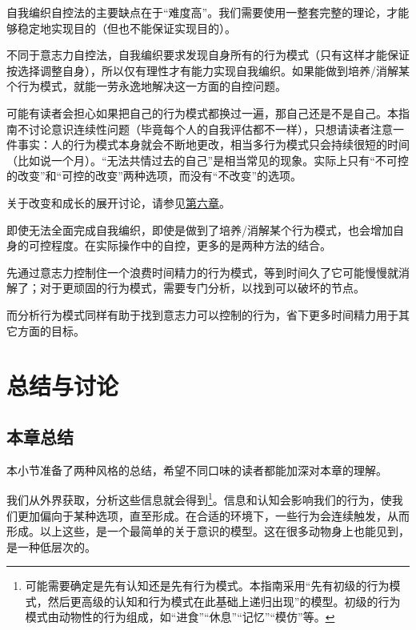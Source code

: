 自我编织自控法的主要缺点在于“难度高”。我们需要使用一整套完整的理论，才能够稳定地实现目的（但也不能保证实现目的）。
\begin{explain}
不同于意志力自控法，自我编织要求发现自身所有的行为模式（只有这样才能保证按选择调整自身），所以仅有理性才有能力实现自我编织。如果能做到培养/消解某个行为模式，就能一劳永逸地解决这一方面的自控问题。

可能有读者会担心如果把自己的行为模式都换过一遍，那自己还是不是自己。本指南不讨论意识连续性问题（毕竟每个人的自我评估都不一样），只想请读者注意一件事实：人的行为模式本身就会不断地更改，相当多行为模式只会持续很短的时间（比如说一个月）。“无法共情过去的自己”是相当常见的现象。实际上只有“不可控的改变”和“可控的改变”两种选项，而没有“不改变”的选项。

关于改变和成长的展开讨论，请参见\hyperref[chap:成长]{第六章}。
\end{explain}
即使无法全面完成自我编织，即使是做到了培养/消解某个行为模式，也会增加自身的可控程度。在实际操作中的自控，更多的是两种方法的结合。
\begin{examples}
先通过意志力控制住一个浪费时间精力的行为模式，等到时间久了它可能慢慢就消解了；对于更顽固的行为模式，需要专门分析，以找到可以破坏的节点。

而分析行为模式同样有助于找到意志力可以控制的行为，省下更多时间精力用于其它方面的目标。
\end{examples}

\section{总结与讨论}
\subsection{本章总结}
\begin{explain}
本小节准备了两种风格的总结，希望不同口味的读者都能加深对本章的理解。
\end{explain}

我们从外界获取，分析这些信息就会得到\footnote{\rigorous 可能需要确定是先有认知还是先有行为模式。本指南采用“先有初级的行为模式，然后更高级的认知和行为模式在此基础上递归出现”的模型。初级的行为模式由动物性的行为组成，如“进食”“休息”“记忆”“模仿”等。}。信息和认知会影响我们的行为，使我们更加偏向于某种选项，直至形成。在合适的环境下，一些行为会连续触发，从而形成。以上这些，是一个最简单的关于意识的模型。这在很多动物身上也能见到，是一种低层次的。

